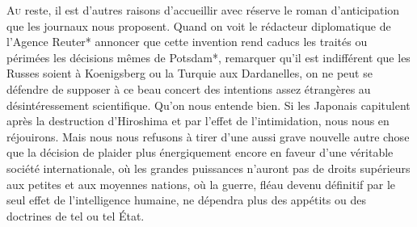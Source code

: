 \begin{multicols}{2}
    \lettrine{\color{RoyalBlue}A\color{black}}u reste, il est d'autres raisons
    d'accueillir avec réserve le roman d'anticipation que les journaux nous
    proposent. Quand on voit le rédacteur
    diplomatique de l'Agence Reuter* annoncer que cette invention rend caducs les
    traités ou périmées les décisions mêmes de Potsdam*, remarquer qu'il est
    indifférent que les Russes soient à Koenigsberg ou la Turquie aux Dardanelles,
    on ne peut se défendre de supposer à ce beau concert des intentions assez
    étrangères au désintéressement scientifique. Qu'on nous entende bien. Si les
    Japonais capitulent après la destruction d'Hiroshima et par l'effet de
    l'intimidation, nous nous en réjouirons. Mais nous nous refusons à tirer d'une
    aussi grave nouvelle autre chose que la décision de plaider plus énergiquement
    encore en faveur d'une véritable société internationale, où les grandes
    puissances n'auront pas de droits supérieurs aux petites et aux moyennes
    nations, où la guerre, fléau devenu définitif par le seul effet de
    l'intelligence humaine, ne dépendra plus des appétits ou des doctrines de tel ou
    tel État.
\end{multicols}

\pagebreak


